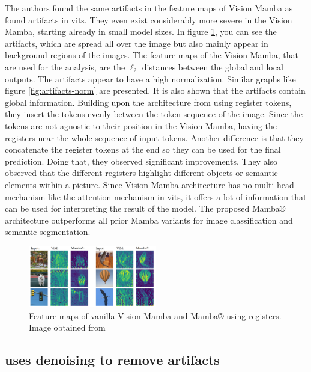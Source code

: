 \documentclass[conference]{IEEEtran}
\begin{document}
  The authors found the same artifacts in the feature maps of Vision Mamba as \citeauthor{registers} found artifacts in \acp{vit}. They even exist considerably more severe in the Vision Mamba, starting already in small model sizes. In figure \ref{fig:mamba-artifacts}, you can see the artifacts, which are spread all over the image but also mainly appear in background regions of the images. The feature maps of the Vision Mamba, that are used for the analysis, are the $\ell_2$ distances between the global and local outputs. The artifacts appear to have a high normalization. Similar graphs like figure \ref{fig:artifacts-norm} are presented. It is also shown that the artifacts contain global information. Building upon the architecture from \cite{registers} using register tokens, they insert the tokens evenly between the token sequence of the image. Since the tokens are not agnostic to their position in the Vision Mamba, having the registers near the whole sequence of input tokens. Another difference is that they concatenate the register tokens at the end so they can be used for the final prediction. Doing that, they observed significant improvements. They also observed that the different registers highlight different objects or semantic elements within a picture. Since Vision Mamba architecture has no multi-head mechanism like the attention mechanism in \acp{vit}, it offers a lot of information that can be used for interpreting the result of the model. The proposed Mamba® architecture outperforms all prior Mamba variants for image classification and semantic segmentation. \cite{mamba-needs-registers}

  \begin{figure}
    \centering
    \includegraphics[width=0.5\textwidth]{figures/mamba-artifacts.png}
    \caption{Feature maps of vanilla Vision Mamba \cite{vision-mamba} and Mamba® using registers. Image obtained from \cite{mamba-needs-registers}}
    \label{fig:mamba-artifacts}
  \end{figure}

  \subsection{\citeauthor{denoising} uses denoising to remove artifacts}
  \label{sec:buildup:denoising}
\end{document}
